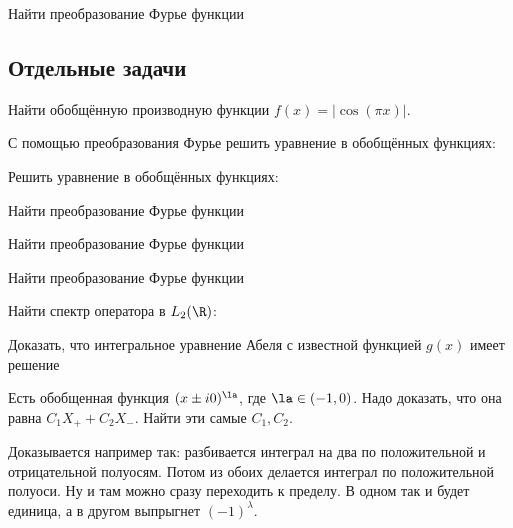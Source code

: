 \documentclass[a4paper]{article}
\begin{document}
\begin{problem}
Найти преобразование Фурье функции
\end{problem}

\subsection{Отдельные задачи}
\setcounter{problem}{0}

\begin{problem}
Найти обобщённую производную функции $f(x) = |\cos (\pi x)|$.
\end{problem}

\begin{problem}
С помощью преобразования Фурье решить уравнение в обобщённых функциях:
\end{problem}


\begin{problem}
Решить уравнение в обобщённых функциях:
\end{problem}

\begin{problem}
Найти преобразование Фурье функции
\end{problem}


\begin{problem}
Найти преобразование Фурье функции
\end{problem}

\begin{problem}
Найти преобразование Фурье функции
\end{problem}

\begin{problem}
Найти спектр оператора в $L_2(\R)$:
\end{problem}

\begin{problem}
Доказать, что интегральное уравнение Абеля
с известной функцией $g(x)$ имеет решение
\end{problem}

\begin{problem}
Есть обобщенная функция $(x \pm i0)^{\la}$, где $\la\in(-1,0)$.
Надо доказать, что она равна $C_1X_{+}+C_2X_{-}$. Найти эти самые $C_1, C_2$.
\end{problem}
\begin{hint}
Доказывается например так: разбивается интеграл на два по положительной и отрицательной полуосям.
Потом из обоих делается интеграл по положительной полуоси. Ну и там можно сразу переходить к пределу.
В одном так и будет единица, а в другом выпрыгнет $(-1)^{\lambda}$.
\end{hint}
\end{document}
